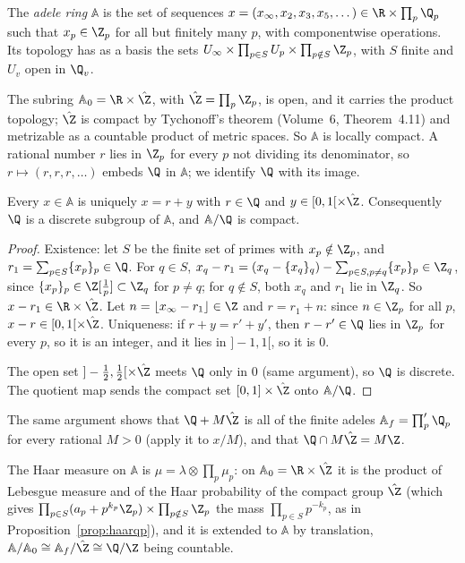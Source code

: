 \begin{definition}
The \emph{adele ring} $\mathbb A$ is the set of sequences $x=(x_\infty,x_2,x_3,x_5,\dots)\in\R\times\prod_p\Q_p$ such that $x_p\in\Z_p$ for all but finitely many $p$, with
componentwise operations. Its topology has as a basis the sets $U_\infty\times\prod_{p\in S}U_p\times\prod_{p\notin S}\Z_p$, with $S$ finite and $U_v$ open in $\Q_v$.
\end{definition}

The subring $\mathbb A_0=\R\times\hat{\Z}$, with $\hat{\Z}=\prod_p\Z_p$, is open, and it carries the product topology; $\hat{\Z}$ is compact by Tychonoff's theorem (Volume~6,
Theorem~4.11) and metrizable as a countable product of metric spaces. So $\mathbb A$ is locally compact. A rational number $r$ lies in $\Z_p$ for every $p$ not dividing its
denominator, so $r\mapsto(r,r,r,\dots)$ embeds $\Q$ in $\mathbb A$; we identify $\Q$ with its image.

\begin{theorem}\label{thm:adelefund}
Every $x\in\mathbb A$ is uniquely $x=r+y$ with $r\in\Q$ and $y\in[0,1[\times\hat{\Z}$. Consequently $\Q$ is a discrete subgroup of $\mathbb A$, and $\mathbb A/\Q$ is compact.
\end{theorem}
\begin{proof}
Existence: let $S$ be the finite set of primes with $x_p\notin\Z_p$, and $r_1=\sum_{p\in S}\{x_p\}_p\in\Q$. For $q\in S$, $x_q-r_1=(x_q-\{x_q\}_q)-\sum_{p\in S,p\ne q}\{x_p\}_p\in\Z_q$, since
$\{x_p\}_p\in\Z[\frac1p]\subset\Z_q$ for $p\ne q$; for $q\notin S$, both $x_q$ and $r_1$ lie in $\Z_q$. So $x-r_1\in\R\times\hat{\Z}$. Let $n=\lfloor x_\infty-r_1\rfloor\in\Z$ and $r=r_1+n$: since
$n\in\Z_p$ for all $p$, $x-r\in[0,1[\times\hat{\Z}$. Uniqueness: if $r+y=r'+y'$, then $r-r'\in\Q$ lies in $\Z_p$ for every $p$, so it is an integer, and it lies in $]-1,1[$, so it is $0$.

The open set $]-\frac12,\frac12[\times\hat{\Z}$ meets $\Q$ only in $0$ (same argument), so $\Q$ is discrete. The quotient map sends the compact set $[0,1]\times\hat{\Z}$ onto $\mathbb A/\Q$.
\end{proof}

The same argument shows that $\Q+M\hat{\Z}$ is all of the finite adeles $\mathbb A_f=\prod'_p\Q_p$ for every rational $M>0$ (apply it to $x/M$), and that $\Q\cap M\hat{\Z}=M\Z$.

\begin{definition}
The Haar measure on $\mathbb A$ is $\mu=\lambda\otimes\prod_p\mu_p$: on $\mathbb A_0=\R\times\hat{\Z}$ it is the product of Lebesgue measure and of the Haar probability of the compact group
$\hat{\Z}$ (which gives $\prod_{p\in S}(a_p+p^{k_p}\Z_p)\times\prod_{p\notin S}\Z_p$ the mass $\prod_{p\in S}p^{-k_p}$, as in Proposition~\ref{prop:haarqp}), and it is extended to $\mathbb A$ by
translation, $\mathbb A/\mathbb A_0\cong\mathbb A_f/\hat{\Z}\cong\Q/\Z$ being countable.
\end{definition}

